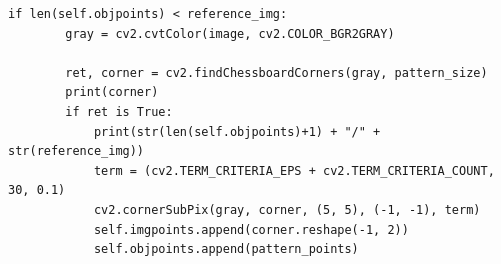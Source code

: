 \begin{lstlisting}[caption=calibration code,label=calib_code]
    if len(self.objpoints) < reference_img:                                                                                                                  
        gray = cv2.cvtColor(image, cv2.COLOR_BGR2GRAY)                                                                                                       
                                                                                                                                                            
        ret, corner = cv2.findChessboardCorners(gray, pattern_size)                                                                                          
        print(corner)                                                                                                                                        
        if ret is True:                                                                                                                                      
            print(str(len(self.objpoints)+1) + "/" + str(reference_img))                                                                                     
            term = (cv2.TERM_CRITERIA_EPS + cv2.TERM_CRITERIA_COUNT, 30, 0.1)                                                                                
            cv2.cornerSubPix(gray, corner, (5, 5), (-1, -1), term)                                                                                           
            self.imgpoints.append(corner.reshape(-1, 2))                                                                                                     
            self.objpoints.append(pattern_points)                                                                                                            
                                                                                                                                                            

\end{lstlisting}
